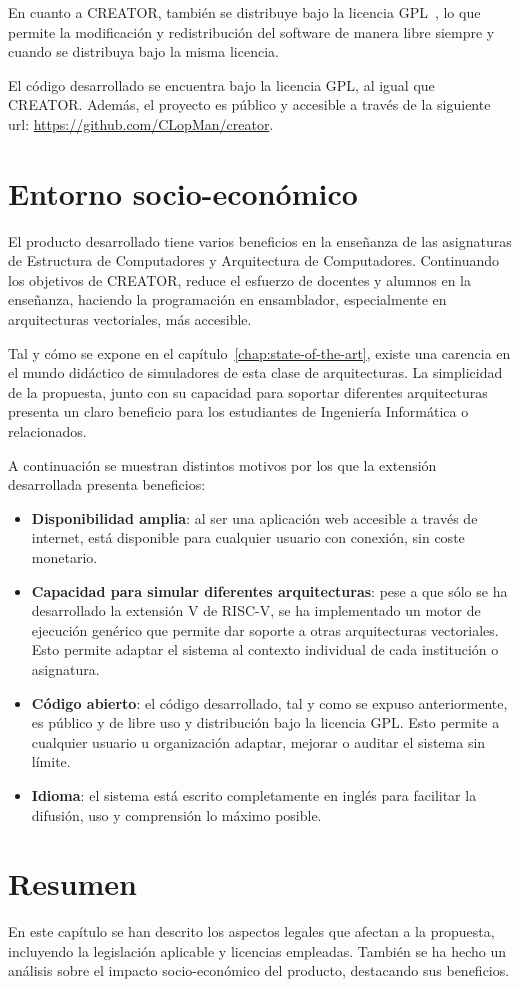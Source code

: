 En cuanto a CREATOR, también se distribuye bajo la licencia GPL~\cite{gnu-license}, lo que permite la modificación y redistribución del software de manera libre siempre y cuando se distribuya bajo la misma licencia.

El código desarrollado se encuentra bajo la licencia GPL, al igual que CREATOR. Además, el proyecto es público y accesible a través de la siguiente url: \url{https://github.com/CLopMan/creator}.

\section{Entorno socio-económico}\label{sec:socio-economico}

El producto desarrollado tiene varios beneficios en la enseñanza de las asignaturas de Estructura de Computadores y Arquitectura de Computadores. Continuando los objetivos de CREATOR, reduce el esfuerzo de docentes y alumnos en la enseñanza, haciendo la programación en ensamblador, especialmente en arquitecturas vectoriales, más accesible.

Tal y cómo se expone en el capítulo~\ref{chap:state-of-the-art}, existe una carencia en el mundo didáctico de simuladores de esta clase de arquitecturas. La simplicidad de la propuesta, junto con su capacidad para soportar diferentes arquitecturas presenta un claro beneficio para los estudiantes de Ingeniería Informática o relacionados.

A continuación se muestran distintos motivos por los que la extensión desarrollada presenta beneficios:
\begin{itemize}
    \item \textbf{Disponibilidad amplia}: al ser una aplicación web accesible a través de internet, está disponible para cualquier usuario con conexión, sin coste monetario.
    \item \textbf{Capacidad para simular diferentes arquitecturas}: pese a que sólo se ha desarrollado la extensión V de RISC-V, se ha implementado un motor de ejecución genérico que permite dar soporte a otras arquitecturas vectoriales. Esto permite adaptar el sistema al contexto individual de cada institución o asignatura.
    \item\textbf{Código abierto}: el código desarrollado, tal y como se expuso anteriormente, es público y de libre uso y distribución bajo la licencia GPL. Esto permite a cualquier usuario u organización adaptar, mejorar o auditar el sistema sin límite.
    \item\textbf{Idioma}: el sistema está escrito completamente en inglés para facilitar la difusión, uso y comprensión lo máximo posible.
\end{itemize}

\section{Resumen}
En este capítulo se han descrito los aspectos legales que afectan a la propuesta, incluyendo la legislación aplicable y licencias empleadas. También se ha hecho un análisis sobre el impacto socio-económico del producto, destacando sus beneficios.
